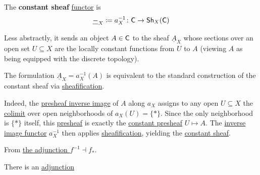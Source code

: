 \documentclass[../../main]{subfiles}
\begin{document}
\begin{definition}\label{def:constant-sheaf}
  The \textbf{constant sheaf} \hyperref[def:functor]{functor} is
  \begin{equation*}
    \underline{-}_{X} \coloneq a_{X}^{-1}\colon \mathsf{C} \to \mathsf{Sh}_{X}(\mathsf{C})
  \end{equation*}

  Less abstractly, it sends an object \(A \in \mathsf{C}\) to the sheaf \(\underline{A}_{X}\) whose sections over an open set \(U \subseteq X\) are the locally constant functions from \(U\) to \(A\) (viewing \(A\) as being equipped with the discrete topology).
\end{definition}

\begin{remark}\label{rem:constant-sheaf-sheafification}
  The formulation \(\underline{A}_{X} = a_{X}^{-1}(A)\) is equivalent to the standard construction of the constant sheaf via \hyperref[def:sheafification]{sheafification}.

  Indeed, the \hyperref[def:inverse-image-presheaf]{presheaf inverse image} of \(A\) along \(a_{X}\) assigns to any open \(U \subseteq X\) the \hyperref[def:categorical-colimit]{colimit} over open neighborhoods of \(a_{X}(U) = \{\ast\}\). Since the only neighborhood is \(\{\ast\}\) itself, this \hyperref[def:presheaf]{presheaf} is exactly the \hyperref[def:constant-presheaf]{constant presheaf} \(U \mapsto A\). The \hyperref[def:inverse-image-sheaf]{inverse image functor} \(a_{X}^{-1}\) then applies \hyperref[def:sheafification]{sheafification}, yielding the \hyperref[def:constant-sheaf]{constant sheaf}.
\end{remark}

From \hyperref[thm:direct-inverse-image-adjunction-sheaf]{the adjunction \(f^{-1} \dashv f_{\ast}\)}.
\begin{corollary}\label{cor:global-constant-adjunction-sheaf}
  There is an \hyperref[def:adjoint-functors]{adjunction}
  \begin{center}
\end{center}
\end{corollary}
\end{document}
